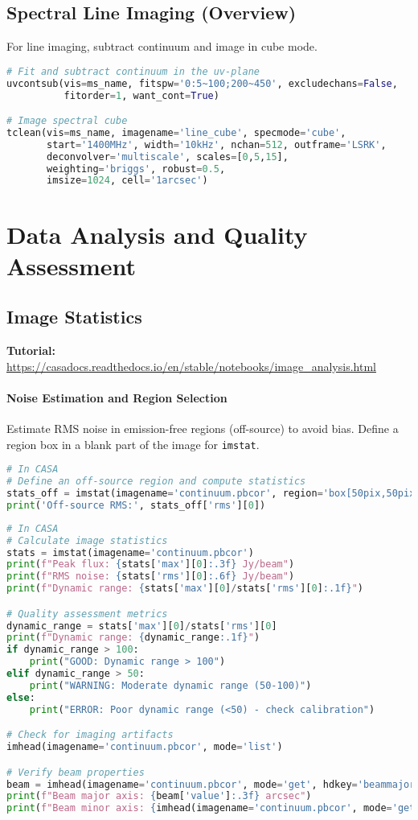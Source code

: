 \documentclass[11pt]{article}
\begin{document}
\subsection{Spectral Line Imaging (Overview)}
For line imaging, subtract continuum and image in cube mode.
\begin{lstlisting}[language=Python]
# Fit and subtract continuum in the uv-plane
uvcontsub(vis=ms_name, fitspw='0:5~100;200~450', excludechans=False,
          fitorder=1, want_cont=True)

# Image spectral cube
tclean(vis=ms_name, imagename='line_cube', specmode='cube',
       start='1400MHz', width='10kHz', nchan=512, outframe='LSRK',
       deconvolver='multiscale', scales=[0,5,15],
       weighting='briggs', robust=0.5,
       imsize=1024, cell='1arcsec')
\end{lstlisting}

\section{Data Analysis and Quality Assessment}

\subsection{Image Statistics}
\textbf{Tutorial:} \url{https://casadocs.readthedocs.io/en/stable/notebooks/image\_analysis.html}
\paragraph{Noise Estimation and Region Selection}
Estimate RMS noise in emission-free regions (off-source) to avoid bias. Define a region box in a blank part of the image for \texttt{imstat}.
\begin{lstlisting}[language=Python]
# In CASA
# Define an off-source region and compute statistics
stats_off = imstat(imagename='continuum.pbcor', region='box[50pix,50pix,150pix,150pix]')
print('Off-source RMS:', stats_off['rms'][0])
\end{lstlisting}
\begin{lstlisting}[language=Python]
# In CASA
# Calculate image statistics
stats = imstat(imagename='continuum.pbcor')
print(f"Peak flux: {stats['max'][0]:.3f} Jy/beam")
print(f"RMS noise: {stats['rms'][0]:.6f} Jy/beam")
print(f"Dynamic range: {stats['max'][0]/stats['rms'][0]:.1f}")

# Quality assessment metrics
dynamic_range = stats['max'][0]/stats['rms'][0]
print(f"Dynamic range: {dynamic_range:.1f}")
if dynamic_range > 100:
    print("GOOD: Dynamic range > 100")
elif dynamic_range > 50:
    print("WARNING: Moderate dynamic range (50-100)")
else:
    print("ERROR: Poor dynamic range (<50) - check calibration")

# Check for imaging artifacts
imhead(imagename='continuum.pbcor', mode='list')

# Verify beam properties
beam = imhead(imagename='continuum.pbcor', mode='get', hdkey='beammajor')
print(f"Beam major axis: {beam['value']:.3f} arcsec")
print(f"Beam minor axis: {imhead(imagename='continuum.pbcor', mode='get', hdkey='beamminor')['value']:.3f} arcsec")
\end{lstlisting}
\end{document}
